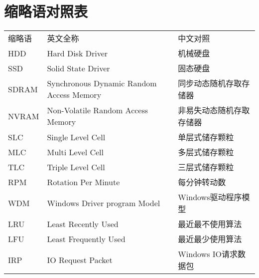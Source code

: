 
\chapter*{缩略语对照表}

\begin{tabular}{lll}
  缩略语 & 英文全称 & 中文对照\\
  HDD   & Hard Disk Driver & 机械硬盘\\
  SSD   & Solid State Driver & 固态硬盘\\
  SDRAM & Synchronous Dynamic Random Access Memory & 同步动态随机存取存储器\\
  NVRAM & Non-Volatile Random Access Memory & 非易失动态随机存取存储器\\
  SLC   & Single Level Cell & 单层式储存颗粒\\
  MLC   & Multi Level Cell & 多层式储存颗粒\\
  TLC   & Triple Level Cell & 三层式储存颗粒\\
  RPM   & Rotation Per Minute & 每分钟转动数\\
  WDM   & Windows Driver program Model & Windows驱动程序模型\\
  LRU   & Least Recently Used & 最近最不使用算法\\
  LFU   & Least Frequently Used & 最近最少使用算法\\
  IRP   & IO Request Packet & Windows IO请求数据包\\
\end{tabular}
